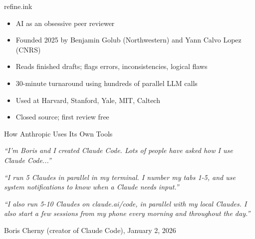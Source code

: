 \documentclass[aspectratio=169]{beamer}
\begin{document}
\begin{frame}{refine.ink}
    \begin{itemize}
        \item AI as an obsessive peer reviewer
        \vspace{0.3em}
        \item Founded 2025 by Benjamin Golub (Northwestern) and Yann Calvo Lopez (CNRS)
        \vspace{0.3em}
        \item Reads finished drafts; flags errors, inconsistencies, logical flaws
        \vspace{0.3em}
        \item 30-minute turnaround using hundreds of parallel LLM calls
        \vspace{0.3em}
        \item Used at Harvard, Stanford, Yale, MIT, Caltech
        \vspace{0.3em}
        \item Closed source; first review free
    \end{itemize}
\end{frame}


\begin{frame}{How Anthropic Uses Its Own Tools}
    \begin{tcolorbox}[colback=blue!5,colframe=blue!40,boxrule=0.8pt,arc=4pt]
    \textit{``I'm Boris and I created Claude Code. Lots of people have asked how I use Claude Code...''}

    \vspace{0.4em}
    \textit{``I run 5 Claudes in parallel in my terminal. I number my tabs 1-5, and use system notifications to know when a Claude needs input.''}

    \vspace{0.4em}
    \textit{``I also run 5-10 Claudes on claude.ai/code, in parallel with my local Claudes. I also start a few sessions from my phone every morning and throughout the day.''}
    \end{tcolorbox}

    \vspace{0.6em}
    Boris Cherny (creator of Claude Code), January 2, 2026
\end{frame}
\end{document}
